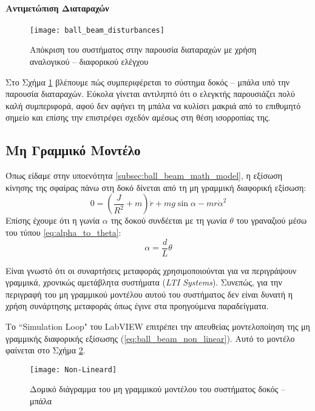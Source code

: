 \paragraph{Αντιμετώπιση Διαταραχών} \label{par:disturbances}\hfill

\begin{figure}[h]
  \centering
  \texttt{[image: ball\_beam\_disturbances]}
  \caption{Απόκριση του συστήματος στην παρουσία διαταραχών με χρήση αναλογικού -- διαφορικού ελέγχου}
  \label{fig:ball_beam_disturbances}
\end{figure}

Στο Σχήμα \ref{fig:ball_beam_disturbances} βλέπουμε πώς συμπεριφέρεται το σύστημα δοκός -- μπάλα υπό την παρουσία διαταραχών. Εύκολα γίνεται αντιληπτό ότι ο ελεγκτής παρουσιάζει πολύ καλή συμπεριφορά, αφού δεν αφήνει τη μπάλα να κυλίσει μακριά από το επιθυμητό σημείο και επίσης την επιστρέφει σχεδόν αμέσως στη θέση ισορροπίας της.

\subsection{Μη Γραμμικό Μοντέλο}

Όπως είδαμε στην υποενότητα \ref{subsec:ball_beam_math_model}, η εξίσωση κίνησης της σφαίρας πάνω στη δοκό δίνεται από τη μη γραμμική διαφορική εξίσωση:
\begin{equation*}
0 = \left(\frac{J}{R^2}+m\right)\ddot{r}+mg\sin\alpha - mr\dot{\alpha}^2
\end{equation*}
Επίσης έχουμε ότι η γωνία $\alpha$ της δοκού συνδέεται με τη γωνία $\theta$ του γραναζιού μέσω του τύπου \ref{eq:alpha_to_theta}:
\begin{equation*}
\alpha = \frac{d}{L}\theta
\end{equation*}

Είναι γνωστό ότι οι συναρτήσεις μεταφοράς χρησιμοποιούνται για να περιγράψουν γραμμικά, χρονικώς αμετάβλητα συστήματα (\emph{LTI Systems}). Συνεπώς, για την περιγραφή του μη γραμμικού μοντέλου αυτού του συστήματος δεν είναι δυνατή η χρήση συνάρτησης μεταφοράς όπως έγινε στα προηγούμενα παραδείγματα.

Το ``Simulation Loop" του LabVIEW επιτρέπει την απευθείας μοντελοποίηση της μη γραμμικής διαφορικής εξίσωσης (\ref{eq:ball_beam_non_linear}). Αυτό το μοντέλο φαίνεται στο Σχήμα \ref{fig:Non-Lineard}.

\begin{figure}[h]
  \centering
  \texttt{[image: Non-Lineard]}
  \caption{Δομικό διάγραμμα του μη γραμμικού μοντέλου του συστήματος δοκός -- μπάλα}
  \label{fig:Non-Lineard}
\end{figure}


